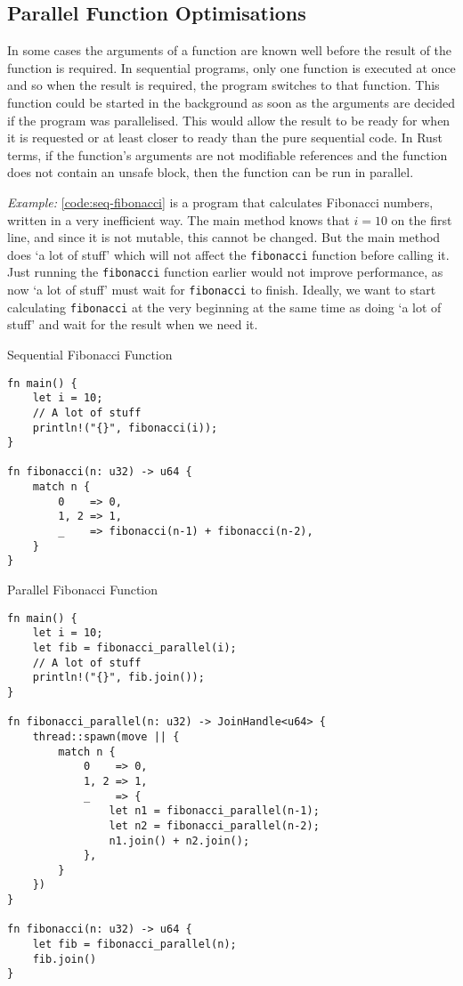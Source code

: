 \documentclass[conference]{IEEEtran}
\begin{document}
\subsection{Parallel Function Optimisations}
In some cases the arguments of a function are known well before the result of the function is required. In sequential programs, only one function is executed at once and so when the result is required, the program switches to that function. This function could be started in the background as soon as the arguments are decided if the program was parallelised. This would allow the result to be ready for when it is requested or at least closer to ready than the pure sequential code.
In Rust terms, if the function's arguments are not modifiable references and the function does not contain an unsafe block, then the function can be run in parallel.

\textit{Example:}
\autoref{code:seq-fibonacci} is a program that calculates Fibonacci numbers, written in a very inefficient way. The main method knows that $i = 10$ on the first line, and since it is not mutable, this cannot be changed. But the main method does `a lot of stuff' which will not affect the \texttt{fibonacci} function before calling it. Just running the \texttt{fibonacci} function earlier would not improve performance, as now `a lot of stuff' must wait for \texttt{fibonacci} to finish. Ideally, we want to start calculating \texttt{fibonacci} at the very beginning at the same time as doing `a lot of stuff' and wait for the result when we need it.

\begin{algorithm}
\caption{Sequential Fibonacci Function}
\label{code:seq-fibonacci}
\begin{verbatim}
fn main() {
    let i = 10;
    // A lot of stuff
    println!("{}", fibonacci(i));
}

fn fibonacci(n: u32) -> u64 {
    match n {
        0    => 0,
        1, 2 => 1,
        _    => fibonacci(n-1) + fibonacci(n-2),
    }
}
\end{verbatim}
\end{algorithm}

\begin{algorithm}
\caption{Parallel Fibonacci Function}
\label{code:par-fibonacci}
\begin{verbatim}
fn main() {
    let i = 10;
    let fib = fibonacci_parallel(i);
    // A lot of stuff
    println!("{}", fib.join());
}

fn fibonacci_parallel(n: u32) -> JoinHandle<u64> {
    thread::spawn(move || {
        match n {
            0    => 0,
            1, 2 => 1,
            _    => {
                let n1 = fibonacci_parallel(n-1);
                let n2 = fibonacci_parallel(n-2);
                n1.join() + n2.join();
            },
        }
    })
}

fn fibonacci(n: u32) -> u64 {
    let fib = fibonacci_parallel(n);
    fib.join()
}
\end{verbatim}
\end{algorithm}
\end{document}
